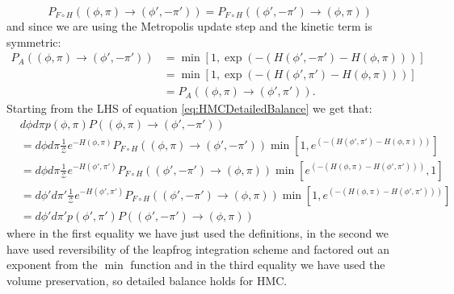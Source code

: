 \documentclass[12pt]{article}
\begin{document}
            \begin{equation}
                P_{F\circ H}\left(\left(\phi,\pi\right) \rightarrow \left(\phi',-\pi'\right)\right) =  P_{F\circ H}\left(\left(\phi',-\pi'\right) \rightarrow \left(\phi,\pi\right)\right)
            \end{equation}
            and since we are using the Metropolis update step and the kinetic term is symmetric:
            \begin{align}
                P_{A}\left(\left(\phi,\pi\right)\rightarrow \left(\phi',-\pi'\right)\right) & = \min\left[1,\exp\left(-\left(H\left(\phi',-\pi'\right)-H\left(\phi,\pi\right)\right)\right)\right] \\
                & = \min\left[1,\exp\left(-\left(H\left(\phi',\pi'\right)-H\left(\phi,\pi\right)\right)\right)\right] \\
                & = P_{A}\left(\left(\phi,\pi\right)\rightarrow \left(\phi',\pi'\right)\right).
            \end{align}
            Starting from the LHS of equation \ref{eq:HMCDetailedBalance} we get that:
            \begin{align}
                & d\phi d\pi p\left(\phi,\pi\right) P\left(\left(\phi,\pi\right)\rightarrow\left(\phi',-\pi'\right)\right) \\
                 & = d\phi d\pi \frac{1}{\mathcal{Z}}e^{-H\left(\phi,\pi\right)}P_{F\circ H}\left(\left(\phi,\pi\right) \rightarrow \left(\phi',-\pi'\right)\right)\min{\left[1,e^{\left(-\left(H\left(\phi',\pi'\right)-H\left(\phi,\pi\right)\right)\right)}\right]}\\ 
                 & = d\phi d\pi \frac{1}{\mathcal{Z}}e^{-H\left(\phi',\pi'\right)}P_{F \circ H}\left(\left(\phi',-\pi'\right) \rightarrow \left(\phi,\pi\right)\right)\min{\left[e^{\left(-\left(H\left(\phi,\pi\right)-H\left(\phi',\pi'\right)\right)\right)},1\right]}\\
                 & = d\phi' d\pi' \frac{1}{\mathcal{Z}}e^{-H\left(\phi',\pi'\right)}P_{F \circ H}\left(\left(\phi',-\pi'\right) \rightarrow \left(\phi,\pi\right)\right)\min\left[1,e^{\left(-\left(H\left(\phi,\pi\right)-H\left(\phi',\pi'\right)\right)\right)}\right]\\
                 & = d\phi' d\pi' p\left(\phi',\pi'\right) P\left(\left(\phi',-\pi'\right)\rightarrow\left(\phi,\pi\right)\right)
            \end{align}
            where in the first equality we have just used the definitions, in the second we have used reversibility of the leapfrog integration scheme and factored out an exponent from the $\min$ function and in the third equality we have used the volume preservation, so detailed balance holds for HMC.
\end{document}
